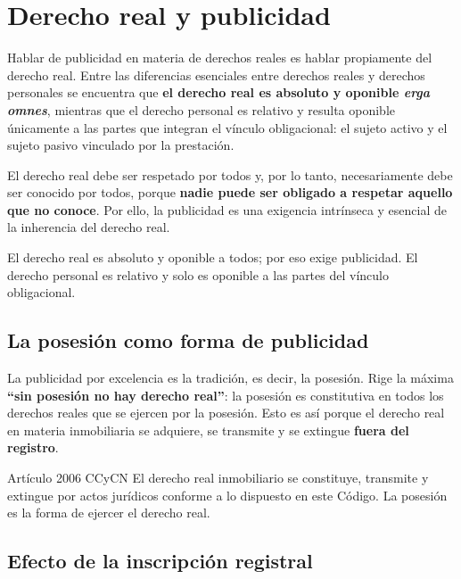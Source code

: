 \documentclass[12pt,oneside]{book}
\begin{document}
\section{Derecho real y publicidad}

Hablar de publicidad en materia de derechos reales es hablar propiamente del derecho real. Entre las diferencias esenciales entre derechos reales y derechos personales se encuentra que \textbf{el derecho real es absoluto y oponible \textit{erga omnes}}, mientras que el derecho personal es relativo y resulta oponible únicamente a las partes que integran el vínculo obligacional: el sujeto activo y el sujeto pasivo vinculado por la prestación.

El derecho real debe ser respetado por todos y, por lo tanto, necesariamente debe ser conocido por todos, porque \textbf{nadie puede ser obligado a respetar aquello que no conoce}. Por ello, la publicidad es una exigencia intrínseca y esencial de la inherencia del derecho real.

\begin{importante}
El derecho real es absoluto y oponible a todos; por eso exige publicidad. El derecho personal es relativo y solo es oponible a las partes del vínculo obligacional.
\end{importante}

\subsection{La posesión como forma de publicidad}

La publicidad por excelencia es la tradición, es decir, la posesión. Rige la máxima \textbf{``sin posesión no hay derecho real''}: la posesión es constitutiva en todos los derechos reales que se ejercen por la posesión. Esto es así porque el derecho real en materia inmobiliaria se adquiere, se transmite y se extingue \textbf{fuera del registro}.

\begin{regla}{Artículo 2006 CCyCN}
El derecho real inmobiliario se constituye, transmite y extingue por actos jurídicos conforme a lo dispuesto en este Código. La posesión es la forma de ejercer el derecho real.
\end{regla}

\subsection{Efecto de la inscripción registral}
\end{document}
